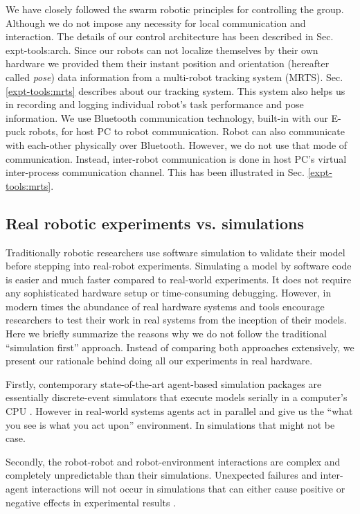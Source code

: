 We have closely followed the swarm robotic principles for controlling the group. Although we do not impose any necessity for local communication and interaction. The details of our control architecture has been described in Sec. {expt-tools:arch}. Since our robots can not localize themselves by their own hardware we  provided them their instant position and orientation (hereafter called {\em pose}) data information from a multi-robot tracking system (MRTS). Sec. \ref{expt-tools:mrts} describes about our tracking system.  This system also helps us in recording and logging  individual robot's task performance and pose information. We use Bluetooth communication technology, built-in with our E-puck robots, for host PC to robot communication. Robot can also communicate with each-other physically over Bluetooth. However, we do not use that mode of communication. Instead, inter-robot communication is done in host PC's virtual inter-process communication channel. This has been illustrated in Sec. \ref{expt-tools:mrts}.
\subsection{Real robotic experiments vs. simulations}
Traditionally robotic researchers use software simulation to validate their model before stepping into real-robot experiments. Simulating a model by software code is easier and much faster compared to real-world experiments. It does not require any sophisticated hardware setup or time-consuming debugging. However, in modern times the abundance of real hardware systems and tools encourage researchers to test their work in real systems from the inception of their models. Here we briefly summarize the reasons why we do not follow the traditional  ``simulation first'' approach. Instead of comparing both approaches extensively, we present our rationale behind doing all our experiments in real hardware.
 
Firstly, contemporary  state-of-the-art agent-based simulation packages are essentially discrete-event simulators that execute models serially in a computer's CPU \cite{Lysenko+2008}. However in real-world systems agents act in parallel and give us the ``what you see is what you act upon''  environment. In simulations that might not be case.

Secondly, the robot-robot and robot-environment interactions are complex and completely unpredictable than their simulations. Unexpected failures and inter-agent interactions will not occur in simulations that can either cause positive or negative effects in experimental results \cite{Krieger+2000}.

